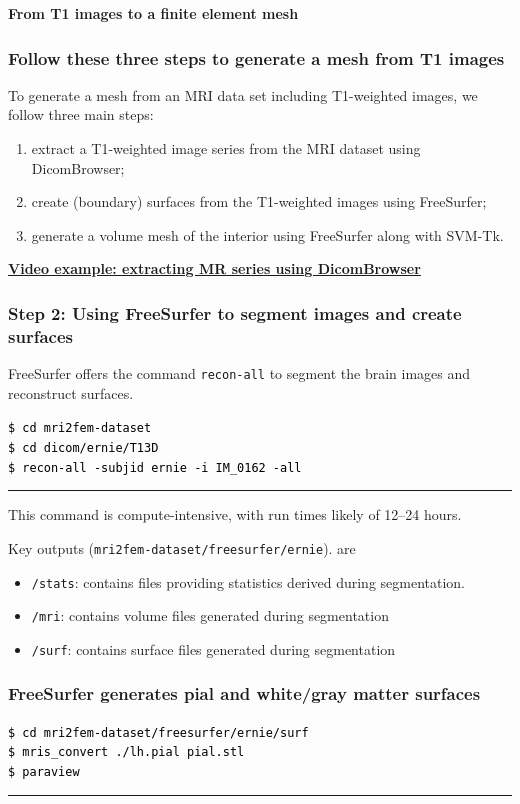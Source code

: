 \documentclass[mathserif, aspectratio=169]{beamer}
\newcommand{\mysection}[1]{\begin{frame} \begin{center} \vspace{3em} \textbf{#1} \end{center} \end{frame}}
\newcommand{\videosection}[2]{\begin{frame} \begin{center} \vspace{3em} \href{#2}{\textcolor{rognesred}{\textbf{#1}}} \end{center} \end{frame}}
\def\formtmpX#1#2{{\vskip3pt\noindent\fboxsep=0pt{\parbox{\textwidth}{\hbox to \textwidth{\hskip3pt\vbox{\raggedright\noindent\textbf{#2\vphantom{Qy}}}\hfill}}}\vskip3pt\par
\noindent\kern0pt}}
\newenvironment{programcode}[1]{\ignorespaces\def\stmtopen##1{##1}%
\formtmpX{programcode}{\centerline{\small{#1}}}}{\noindent\textcolor{programcode}{\rule{\columnwidth}{0pt}}\par\addvspace{\baselineskip}}%
\newcommand{\terminal}[1]{
  \vspace{-1em}
  \begin{programcode}{}%
    \colorbox{blue!10}{\parbox{0.98\textwidth}{\textcolor{black}{\texttt{#1}}}}
  \end{programcode}
  \vspace{-0.5em}
}
\newcommand{\emp}[1]{\texttt{#1}}
\begin{document}
\mysection{From T1 images to a finite element mesh}

\begin{frame}
\frametitle{Follow these three steps to generate a mesh from T1 images}

To generate a mesh from an MRI data set including T1-weighted images,
we follow three main steps:
\bigskip
\begin{enumerate}
\item
  extract a T1-weighted image series from the MRI dataset using DicomBrowser;
\item
  create (boundary) surfaces from the T1-weighted images using FreeSurfer;
\item
  generate a volume mesh of the interior using FreeSurfer along with SVM-Tk.
\end{enumerate}
\end{frame}

\videosection{Video example: extracting MR series using DicomBrowser}{}

\begin{frame}
\frametitle{Step 2: Using FreeSurfer to segment images and create surfaces}

FreeSurfer offers the command \emp{recon-all} to segment the brain images
and reconstruct surfaces. 

\terminal{\$ cd mri2fem-dataset \\
\$ cd dicom/ernie/T13D \\
\$ recon-all -subjid ernie -i IM\_0162 -all}

This command is compute-intensive, with run times likely of 12--24
hours.

Key outputs (\emp{mri2fem-dataset/freesurfer/ernie}). are 
\begin{itemize}
\item \emp{/stats}: contains files providing statistics derived during segmentation.
\item \emp{/mri}: contains volume files generated during segmentation
\item \emp{/surf}: contains surface files generated during segmentation
\end{itemize}
\end{frame}

\begin{frame}
\frametitle{FreeSurfer generates pial and white/gray matter surfaces}

\terminal{\$ cd mri2fem-dataset/freesurfer/ernie/surf\\
\$ mris\_convert ./lh.pial pial.stl \\
\$ paraview}

\end{frame}
\end{document}
